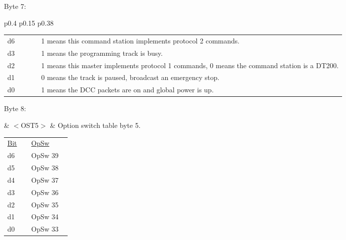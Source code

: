 Byte 7:

\begin{tabular}{p{0.4\linewidth} p{0.15\linewidth} p{0.38\linewidth}} 

\begin{tabular}{|p{0.3cm}|p{0.3cm}|p{0.3cm}|p{0.3cm}|p{0.3cm}|p{0.3cm}|p{0.3cm}|p{0.3cm}|}
\hline
0 & d6 & 0 & 0 & d3 & d2 & d1 & d0\\
\hline
\end{tabular}
& $<$TRK$>$ & \gls{Global System Track Status}.\\
\end{tabular}

\begin{tabular}{p{0.05\linewidth} p{0.9\linewidth}} 
d6 & 1 means this command station implements protocol 2 commands.\\
d3 & 1 means the programming track is busy.\\
d2 & 1 means this master implements protocol 1 commands,  0 means the command station is a DT200.\\
d1 & 0 means the track is paused, broadcast an emergency stop.\\
d0 & 1 means the DCC packets are on and global power is up.\\
\end{tabular}

Byte 8:

& $<$OST5$>$ & Option switch table byte 5.\\
\end{tabular}

\begin{tabular}{p{0.05\linewidth} p{0.1\linewidth} } 
\underline{Bit} & \underline{OpSw} \\
d6 & OpSw 39\\
d5 & OpSw 38\\
d4 & OpSw 37\\
d3 & OpSw 36\\
d2 & OpSw 35\\
d1 & OpSw 34\\
d0 & OpSw 33\\
\end{tabular}

